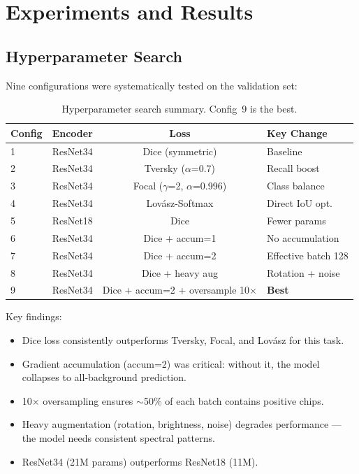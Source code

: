 \documentclass[10pt,a4paper,onecolumn]{article}
\begin{document}
\section{Experiments and Results}

\subsection{Hyperparameter Search}

Nine configurations were systematically tested on the validation set:

\begin{table}[ht]
\centering
\caption{Hyperparameter search summary.  Config~9 is the best.}
\label{tab:hp_search}
\small
\begin{tabular}{lccl}
\toprule
Config & Encoder & Loss & Key Change \\
\midrule
1 & ResNet34 & Dice (symmetric)  & Baseline \\
2 & ResNet34 & Tversky ($\alpha$=0.7) & Recall boost \\
3 & ResNet34 & Focal ($\gamma$=2, $\alpha$=0.996) & Class balance \\
4 & ResNet34 & Lov\'asz-Softmax & Direct IoU opt. \\
5 & ResNet18 & Dice & Fewer params \\
6 & ResNet34 & Dice + accum=1 & No accumulation \\
7 & ResNet34 & Dice + accum=2 & Effective batch 128 \\
8 & ResNet34 & Dice + heavy aug & Rotation + noise \\
9 & ResNet34 & Dice + accum=2 + oversample 10$\times$ & \textbf{Best} \\
\bottomrule
\end{tabular}
\end{table}

Key findings:
\begin{itemize}[nosep]
    \item Dice loss consistently outperforms Tversky, Focal, and
          Lov\'asz for this task.
    \item Gradient accumulation (accum=2) was critical: without it,
          the model collapses to all-background prediction.
    \item 10$\times$ oversampling ensures $\sim$50\% of each batch
          contains positive chips.
    \item Heavy augmentation (rotation, brightness, noise) degrades
          performance --- the model needs consistent spectral patterns.
    \item ResNet34 (21M params) outperforms ResNet18 (11M).
\end{itemize}
\end{document}
